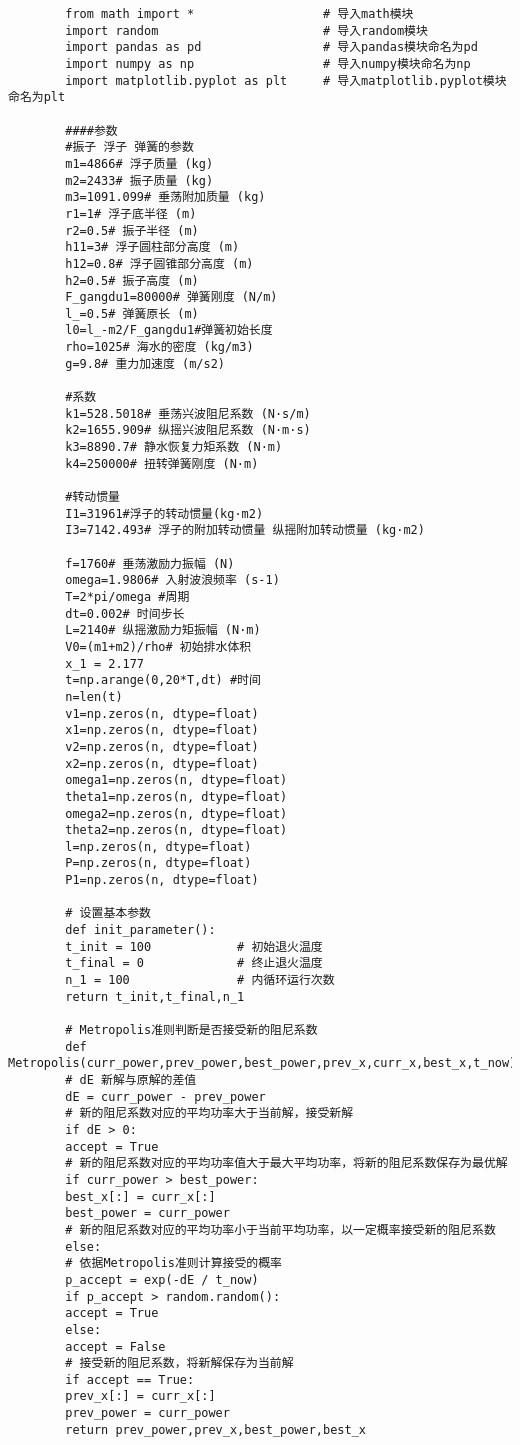 \documentclass[a4paper,12pt]{article}
\begin{document}
	\begin{lstlisting}
		from math import *                  # 导入math模块
		import random                       # 导入random模块
		import pandas as pd                 # 导入pandas模块命名为pd
		import numpy as np                  # 导入numpy模块命名为np
		import matplotlib.pyplot as plt     # 导入matplotlib.pyplot模块命名为plt
		
		####参数
		#振子 浮子 弹簧的参数
		m1=4866# 浮子质量 (kg)
		m2=2433# 振子质量 (kg)
		m3=1091.099# 垂荡附加质量 (kg)
		r1=1# 浮子底半径 (m)
		r2=0.5# 振子半径 (m)
		h11=3# 浮子圆柱部分高度 (m)
		h12=0.8# 浮子圆锥部分高度 (m)
		h2=0.5# 振子高度 (m)
		F_gangdu1=80000# 弹簧刚度 (N/m)
		l_=0.5# 弹簧原长 (m)
		l0=l_-m2/F_gangdu1#弹簧初始长度
		rho=1025# 海水的密度 (kg/m3)
		g=9.8# 重力加速度 (m/s2)
		
		#系数
		k1=528.5018# 垂荡兴波阻尼系数 (N·s/m)
		k2=1655.909# 纵摇兴波阻尼系数 (N·m·s)
		k3=8890.7# 静水恢复力矩系数 (N·m)
		k4=250000# 扭转弹簧刚度 (N·m)
		
		#转动惯量
		I1=31961#浮子的转动惯量(kg·m2)
		I3=7142.493# 浮子的附加转动惯量 纵摇附加转动惯量 (kg·m2)
		
		f=1760# 垂荡激励力振幅 (N)
		omega=1.9806# 入射波浪频率 (s-1)
		T=2*pi/omega #周期
		dt=0.002# 时间步长
		L=2140# 纵摇激励力矩振幅 (N·m)
		V0=(m1+m2)/rho# 初始排水体积
		x_1 = 2.177
		t=np.arange(0,20*T,dt) #时间
		n=len(t)
		v1=np.zeros(n, dtype=float)
		x1=np.zeros(n, dtype=float)
		v2=np.zeros(n, dtype=float)
		x2=np.zeros(n, dtype=float)
		omega1=np.zeros(n, dtype=float)
		theta1=np.zeros(n, dtype=float)
		omega2=np.zeros(n, dtype=float)
		theta2=np.zeros(n, dtype=float)
		l=np.zeros(n, dtype=float)
		P=np.zeros(n, dtype=float)
		P1=np.zeros(n, dtype=float)
		
		# 设置基本参数
		def init_parameter():
		t_init = 100            # 初始退火温度
		t_final = 0             # 终止退火温度
		n_1 = 100               # 内循环运行次数
		return t_init,t_final,n_1
		
		# Metropolis准则判断是否接受新的阻尼系数
		def Metropolis(curr_power,prev_power,best_power,prev_x,curr_x,best_x,t_now):
		# dE 新解与原解的差值
		dE = curr_power - prev_power
		# 新的阻尼系数对应的平均功率大于当前解，接受新解
		if dE > 0:
		accept = True
		# 新的阻尼系数对应的平均功率值大于最大平均功率，将新的阻尼系数保存为最优解
		if curr_power > best_power:
		best_x[:] = curr_x[:]
		best_power = curr_power
		# 新的阻尼系数对应的平均功率小于当前平均功率，以一定概率接受新的阻尼系数
		else:
		# 依据Metropolis准则计算接受的概率
		p_accept = exp(-dE / t_now)
		if p_accept > random.random():
		accept = True
		else:
		accept = False
		# 接受新的阻尼系数，将新解保存为当前解
		if accept == True:
		prev_x[:] = curr_x[:]
		prev_power = curr_power
		return prev_power,prev_x,best_power,best_x
		

\end{lstlisting}
\end{document}
